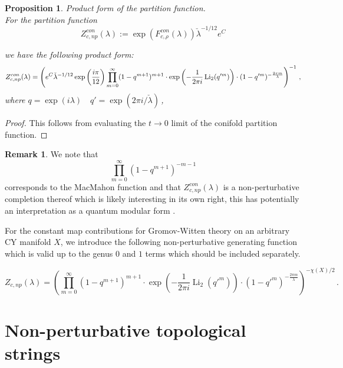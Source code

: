 \documentclass[a4paper,12pt,justification=centering]{article}
\numberwithin{equation}{section}
\newcommand{\ii}{\textnormal{i}}
\theoremstyle{plain}%
\newtheorem{prop}[thm]{Proposition}
\theoremstyle{definition}
\newtheorem{rem}[thm]{Remark}
\begin{document}
\begin{prop}{Product form of the partition function.}\label{prop:prodconst}\\
For the partition function $$ Z^{con}_{c,np}(\lambda):= \exp (F^{con}_{c,\rho}(\lambda)) \check{\lambda}^{-1/12}e^C $$ 

we have the following product form:
\begin{align}
Z^{con}_{c,np}(\lambda) =\left(e^C \check{\lambda}^{-1/12} \exp\left(\frac{\ii \pi}{12} \right) \prod_{m=0}^{\infty} (1- q^{m+1})^{m+1}  \cdot \exp\left(-\frac{1}{2\pi i} \operatorname{Li}_2(q'^m)\right) \cdot (1-q'^m)^{-\frac{ 2\pi m}{\lambda}}\right)^{-1}\,,
\end{align}
where  $ q= \exp( i \lambda) \quad q'=\exp(2\pi i/\check{\lambda})$\,,
\end{prop}
\begin{proof}
This follows from evaluating the $t\rightarrow 0$ limit of the conifold partition function.
\end{proof}
\begin{rem}
We note that $$ \prod_{m=0}^{\infty} (1- q^{m+1})^{-m-1}$$ corresponds to the MacMahon function and that $Z^{con}_{c,np}(\lambda)$ is a non-perturbative completion thereof which is likely interesting in its own right, this has potentially an interpretation as a quantum modular form \cite{zagier2010quantum}.
\end{rem}
For the constant map contributions for Gromov-Witten theory on an arbitrary CY manifold $X$, we introduce the following non-perturbative generating function which is valid up to the genus $0$ and $1$ terms which should be included separately.

\begin{equation}
Z_{c,np}(\lambda)= \left( \prod_{m=0}^{\infty} (1- q^{m+1})^{m+1}  \cdot \exp\left(-\frac{1}{2\pi i} \operatorname{Li}_2(q'^m)\right) \cdot (1-q'^m)^{-\frac{ 2\pi m}{\lambda}}\right)^{-\chi(X)/2}\,.
\end{equation}



\section{Non-perturbative topological strings}\label{sec:nonpert}
\end{document}
